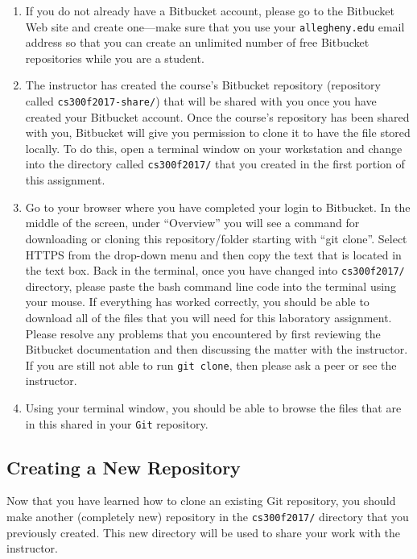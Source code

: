 \begin{enumerate}

  \item If you do not already have a Bitbucket account, please go to the Bitbucket Web site and create one---make sure that you use your {\tt allegheny.edu} email address so that you can create an unlimited number of free Bitbucket repositories while you are a student. 

  \item The instructor has created the course's Bitbucket repository (repository called {\tt cs300f2017-share/}) that will be shared with you once you have created your Bitbucket account. Once the course's repository has been shared with you, Bitbucket will give you permission to clone it to have the file stored locally. To do this, open a terminal window on your workstation and change into the directory called {\tt cs300f2017/} that you created in the first portion of this assignment. %
  
  \item Go to your browser where you have completed your login to Bitbucket. In the middle of the screen, under ``Overview'' you will see a command for downloading or cloning this repository/folder starting with ``git clone''.  Select HTTPS from the drop-down menu and then copy the text that is located in the text box. Back in the terminal, once you have changed into {\tt cs300f2017/} directory, please paste the bash command line code into the terminal using your mouse. If everything has worked correctly, you should be able to download all of the files that you will need for this laboratory assignment. Please resolve any problems that you encountered by first reviewing the Bitbucket documentation and then discussing the matter with the instructor.  If you are still not able to run {\tt git clone}, then please ask a peer or see the instructor.
      
  \item Using your terminal window, you should be able to browse the files that are in this shared in your {\tt Git} repository. 
  
\end{enumerate}

\vspace*{-.2in}
\subsection*{Creating a New Repository}
\vspace*{-.1in}
Now that you have learned how to clone an existing Git repository, you should make another (completely new) repository in the {\tt cs300f2017/} directory that you previously created. This new directory will be used to share your work with the instructor. 



